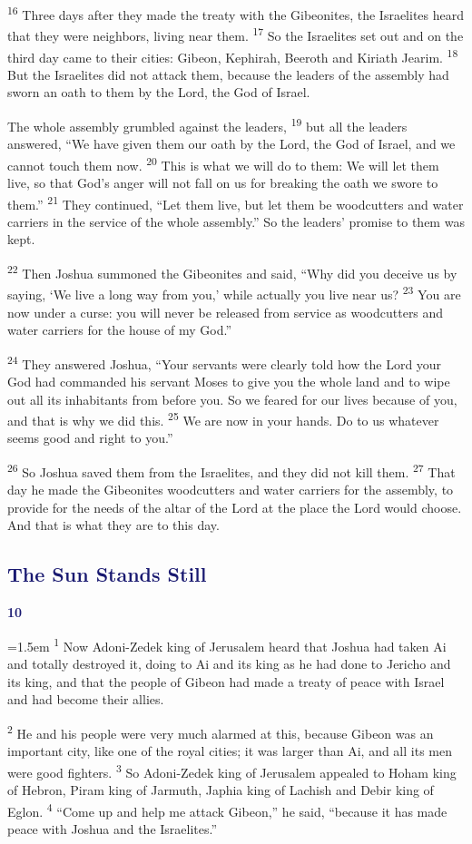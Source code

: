 \documentclass[12pt,twoside]{article}
\newcommand{\vs}[1]{\textsuperscript{#1}}
\newcommand{\chapterWithBigIndent}[2]{%
  \noindent
  \begin{minipage}[t]{1cm}
    \vspace{-0.4\baselineskip}
    {\textcolor{MidnightBlue}{\fontsize{40pt}{48pt}\selectfont \textbf{#1}}}
  \end{minipage}%
  \hspace{0.9cm}%
  \begin{minipage}[t]{\dimexpr\linewidth - 1.5cm - 0.3cm\relax}
    \hangindent=1.5em
    \hangafter=3
    #2
    \vspace{0.05cm}
  \end{minipage}
}
\begin{document}
\vs{16} Three days after they made the treaty with the Gibeonites, the Israelites heard that they were neighbors, living near them.
\vs{17} So the Israelites set out and on the third day came to their cities: Gibeon, Kephirah, Beeroth and Kiriath Jearim.
\vs{18} But the Israelites did not attack them, because the leaders of the assembly had sworn an oath to them by the Lord, the God of Israel.

The whole assembly grumbled against the leaders,
\vs{19} but all the leaders answered, ``We have given them our oath by the Lord, the God of Israel, and we cannot touch them now.
\vs{20} This is what we will do to them: We will let them live, so that God's anger will not fall on us for breaking the oath we swore to them.''
\vs{21} They continued, ``Let them live, but let them be woodcutters and water carriers in the service of the whole assembly.'' So the leaders' promise to them was kept.

\vs{22} Then Joshua summoned the Gibeonites and said, ``Why did you deceive us by saying, `We live a long way from you,' while actually you live near us?
\vs{23} You are now under a curse: you will never be released from service as woodcutters and water carriers for the house of my God.''

\vs{24} They answered Joshua, ``Your servants were clearly told how the Lord your God had commanded his servant Moses to give you the whole land and to wipe out all its inhabitants from before you. So we feared for our lives because of you, and that is why we did this.
\vs{25} We are now in your hands. Do to us whatever seems good and right to you.''

\vs{26} So Joshua saved them from the Israelites, and they did not kill them.
\vs{27} That day he made the Gibeonites woodcutters and water carriers for the assembly, to provide for the needs of the altar of the Lord at the place the Lord would choose. And that is what they are to this day.

\subsection*{\textcolor{MidnightBlue}{\textbf{The Sun Stands Still}}}
\chapterWithBigIndent{10}{%
  \vs{1} Now Adoni-Zedek king of Jerusalem heard that Joshua had taken Ai and totally destroyed it, doing to Ai and its king as he had done to Jericho and its king, and that the people of Gibeon had made a treaty of peace with Israel and had become their allies.
}
\vs{2} He and his people were very much alarmed at this, because Gibeon was an important city, like one of the royal cities; it was larger than Ai, and all its men were good fighters.
\vs{3} So Adoni-Zedek king of Jerusalem appealed to Hoham king of Hebron, Piram king of Jarmuth, Japhia king of Lachish and Debir king of Eglon.
\vs{4} ``Come up and help me attack Gibeon,'' he said, ``because it has made peace with Joshua and the Israelites.''
\end{document}
